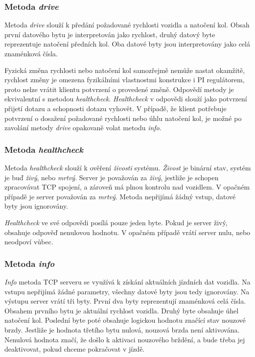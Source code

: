 \documentclass[czech,bachelor,dept460,male,cpp,cpdeclaration]{diploma}
\begin{document}
\subsubsection{Metoda \emph{drive}}
Metoda \emph{drive} slouží k předání požadované rychlosti vozidla a natočení kol. Obsah první datového bytu je interpretován jako 
rychlost, druhý datový byte reprezentuje natočení předních kol. Oba datové byty jsou interpretovány jako celá znaménková čísla. 

Fyzická změna rychlosti nebo natočení kol samozřejmě nemůže nastat okamžitě, rychlost změny je omezena fyzikálními vlastnostmi 
konstrukce i PI regulátorem, proto nelze vrátit klientu potvrzení o provedené změně. Odpovědí metody je ekvivalentní s metodou 
\emph{healthcheck}. \emph{Healthcheck} v odpovědi slouží jako potvrzení přijetí dotazu a schopnosti dotazu vyhovět. V případě, 
že klient potřebuje potvrzení o dosažení požadované rychlosti nebo úhlu natočení kol, je možné po zavolání metody \emph{drive} 
opakovaně volat metodu \emph{info}.

\subsubsection{Metoda \emph{healthcheck}}
Metoda \emph{healthcheck} slouží k ověření \emph{živosti} systému. \emph{Živost} je binární stav, systém je buď \emph{živý}, nebo
\emph{mrtvý}. Server je považován za \emph{živý}, jestliže je schopen zpracovávat TCP spojení, a zároveň má plnou kontrolu 
nad vozidlem. V opačném případě je server považován za \emph{mrtvý}. Metoda nepřijímá žádný vstup, datové byty jsou ignorovány.

\emph{Healthcheck} ve své odpovědi posílá pouze jeden byte. Pokud je server živý, obsahuje odpověď nenulovou hodnotu. V opačném
případě vrátí server nulu, nebo neodpoví vůbec.

\subsubsection{Metoda \emph{info}}
\emph{Info} metoda TCP serveru se využívá k získání aktuálních jízdních dat vozidla. Na vstupu nepřijímá žádné parametry, všechny
datové byty jsou tedy ignorovány. Na výstupu server vrátí tři byty. První dva byty reprezentují znaménková celá čísla. Obsahem
prvního bytu je aktuální rychlost vozidla. Druhý byte obsahuje úhel natočení kol. Poslední byte poté obsahuje logickou hodnotu
značící stav nouzové brzdy. Jestliže je hodnota třetího bytu nulová, nouzová brzda není aktivována. Nenulová hodnota značí, 
že došlo k aktivaci nouzového brždění, a bude třeba jej deaktivovat, pokud chceme pokračovat v jízdě.
\end{document}
